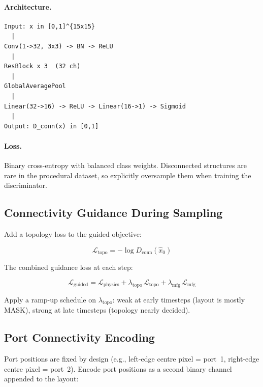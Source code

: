 \documentclass[12pt,a4paper]{article}
\theoremstyle{definition}
\theoremstyle{plain}
\theoremstyle{remark}
\begin{document}
\paragraph{Architecture.}
\begin{lstlisting}[caption={Connectivity discriminator architecture.}]
Input: x in [0,1]^{15x15}
  |
Conv(1->32, 3x3) -> BN -> ReLU
  |
ResBlock x 3  (32 ch)
  |
GlobalAveragePool
  |
Linear(32->16) -> ReLU -> Linear(16->1) -> Sigmoid
  |
Output: D_conn(x) in [0,1]
\end{lstlisting}

\paragraph{Loss.}
Binary cross-entropy with balanced class weights.
Disconnected structures are rare in the procedural dataset, so explicitly oversample
them when training the discriminator.

\subsection{Connectivity Guidance During Sampling}

Add a topology loss to the guided objective:

\begin{equation}
  \mathcal{L}_{\mathrm{topo}} = -\log D_{\mathrm{conn}}(\hat{x}_0)
  \label{eq:ltopo}
\end{equation}

The combined guidance loss at each step:

\begin{equation}
  \mathcal{L}_{\mathrm{guided}}
  = \mathcal{L}_{\mathrm{physics}}
  + \lambda_{\mathrm{topo}}\, \mathcal{L}_{\mathrm{topo}}
  + \lambda_{\mathrm{mfg}}\, \mathcal{L}_{\mathrm{mfg}}
  \label{eq:lguided}
\end{equation}

Apply a ramp-up schedule on $\lambda_{\mathrm{topo}}$: weak at early timesteps
(layout is mostly MASK), strong at late timesteps (topology nearly decided).

\subsection{Port Connectivity Encoding}

Port positions are fixed by design (e.g., left-edge centre pixel = port~1,
right-edge centre pixel = port~2).
Encode port positions as a second binary channel appended to the layout:
\end{document}
